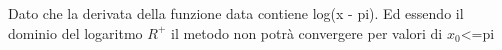 
Dato che la derivata della funzione data contiene log(x - pi).
Ed essendo il dominio del logaritmo \(R^+\) il metodo non potrà convergere per valori di \(x_0\)<=pi
